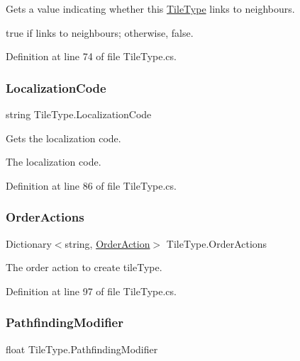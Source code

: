 Gets a value indicating whether this \hyperlink{class_tile_type}{Tile\+Type} links to neighbours. 

{\ttfamily true} if links to neighbours; otherwise, {\ttfamily false}.

Definition at line 74 of file Tile\+Type.\+cs.

\mbox{\label{class_tile_type_aec98b27159318d4f3132015f1a367f00}} 
\subsubsection{\texorpdfstring{Localization\+Code}{LocalizationCode}}
{\footnotesize\ttfamily string Tile\+Type.\+Localization\+Code\hspace{0.3cm}{\ttfamily [get]}}



Gets the localization code. 

The localization code.

Definition at line 86 of file Tile\+Type.\+cs.

\mbox{\label{class_tile_type_af41afc0dfba859d0a1a1449c95579d04}} 
\subsubsection{\texorpdfstring{Order\+Actions}{OrderActions}}
{\footnotesize\ttfamily Dictionary$<$string, \hyperlink{class_project_porcupine_1_1_order_actions_1_1_order_action}{Order\+Action}$>$ Tile\+Type.\+Order\+Actions\hspace{0.3cm}{\ttfamily [get]}}



The order action to create tile\+Type. 



Definition at line 97 of file Tile\+Type.\+cs.

\mbox{\label{class_tile_type_a4325bfa21ffacf67fa1ead7b0394abe7}} 
\subsubsection{\texorpdfstring{Pathfinding\+Modifier}{PathfindingModifier}}
{\footnotesize\ttfamily float Tile\+Type.\+Pathfinding\+Modifier\hspace{0.3cm}{\ttfamily [get]}}



